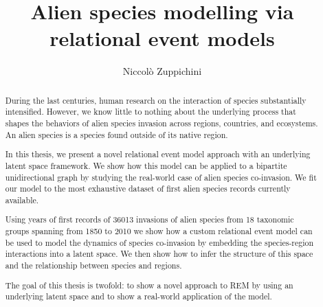 \documentclass[mscthesis]{usiinfthesis}
\title{Alien species modelling via relational event models} %
\author{Niccol\`o Zuppichini} %
\begin{document}
\maketitle %
\frontmatter %

\begin{abstract}
\newcommand\numberevents{36013 } %

During the last centuries, human research on the interaction of species substantially intensified. However, we know little to nothing about the underlying process that shapes the behaviors of alien species invasion across regions, countries, and ecosystems. An alien species is a species found outside of its native region.

In this thesis, we present a novel relational event model approach with an underlying latent space framework. We show how this model can be applied to a bipartite unidirectional graph by studying the real-world case of alien species co-invasion. We fit our model to the most exhaustive dataset of first alien species records currently available.

Using years of first records of 36013 invasions of alien species from 18 taxonomic groups spanning from 1850 to 2010 we show how a custom relational event model can be used to model the dynamics of species co-invasion by embedding the species-region interactions into a latent space. We then show how to infer the structure of this space and the relationship between species and regions. 


The goal of this thesis is twofold: to show a novel approach to REM by using an underlying latent space and to show a real-world application of the model.


\end{abstract}



\mainmatter
\end{document}

